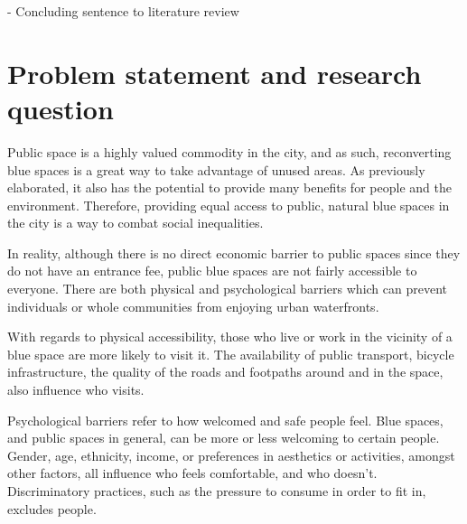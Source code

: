 \documentclass{article}
\begin{document}
- Concluding sentence to literature review

\begin{comment}
- Importance of situating ??

- Right to the city enabled through public blue space (in connection to recognition justice)
	1. Public blue spaces are a shared, common good, that everyone should be able to acces \parencite{wessells2014urban}	
	2. cite more general right to the city literature
	3. Sharing the benefits that waterfronts have on people and the environment

- individuals and communities are inextricably linked to place, and disrupting place/not providing it threatens their existence / belonging

\end{comment}


\pagebreak
\section{Problem statement and research question}

Public space is a highly valued commodity in the city, and as such, reconverting blue spaces is a great way to take advantage of unused areas. As previously elaborated, it also has the potential to provide many benefits for people and the environment. Therefore, providing equal access to public, natural blue spaces in the city is a way to combat social inequalities.

In reality, although there is no direct economic barrier to public spaces since they do not have an entrance fee, public blue spaces are not fairly accessible to everyone. There are both physical and psychological barriers which can prevent individuals or whole communities from enjoying urban waterfronts.

With regards to physical accessibility, those who live or work in the vicinity of a blue space are more likely to visit it. The availability of public transport, bicycle infrastructure, the quality of the roads and footpaths around and in the space, also influence who visits. 

Psychological barriers refer to how welcomed and safe people feel. Blue spaces, and public spaces in general, can be more or less welcoming to certain people. Gender, age, ethnicity, income, or preferences in aesthetics or activities, amongst other factors, all influence who feels comfortable, and who doesn't. 
Discriminatory practices, such as the pressure to consume in order to fit in, excludes people.
\end{document}

